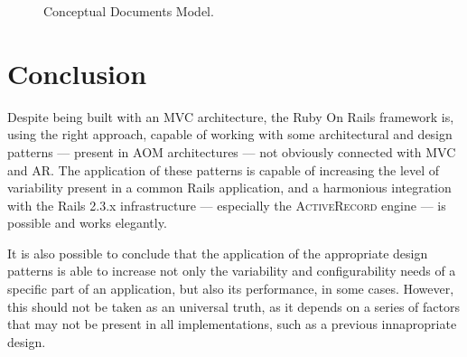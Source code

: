 \documentclass[9pt,a4paper]{extarticle}
\begin{document}
\begin{multicols}{2}
\begin{figure}[H]
  \caption{Conceptual Documents Model.}
  \label{fig:documents_conceptual}
\end{figure}

\section{Conclusion}\label{sec:conclusion}

Despite being built with an MVC architecture, the Ruby On Rails framework is, using the right approach, capable of working with some architectural and design patterns --- present in AOM architectures --- not obviously connected with MVC and AR. The application of these patterns is capable of increasing the level of variability present in a common Rails application, and a harmonious integration with the Rails 2.3.x infrastructure --- especially the \textsc{ActiveRecord} engine --- is possible and works elegantly.

It is also possible to conclude that the application of the appropriate design patterns is able to increase not only the variability and configurability needs of a specific part of an application, but also its performance, in some cases. However, this should not be taken as an universal truth, as it depends on a series of factors that may not be present in all implementations, such as a previous innapropriate design.



\end{multicols}
\end{document}
